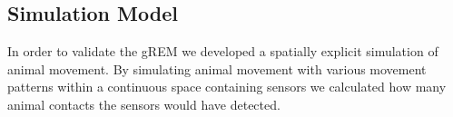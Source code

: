 \documentclass[a4paper,10pt,reqno,oneside]{amsart}
\begin{document}

\subsection{Simulation Model}

In order to validate the gREM we developed a spatially explicit simulation of animal movement. By simulating animal movement with various movement patterns within a continuous space containing sensors we calculated how many animal contacts the sensors would have detected. 
\end{document}

